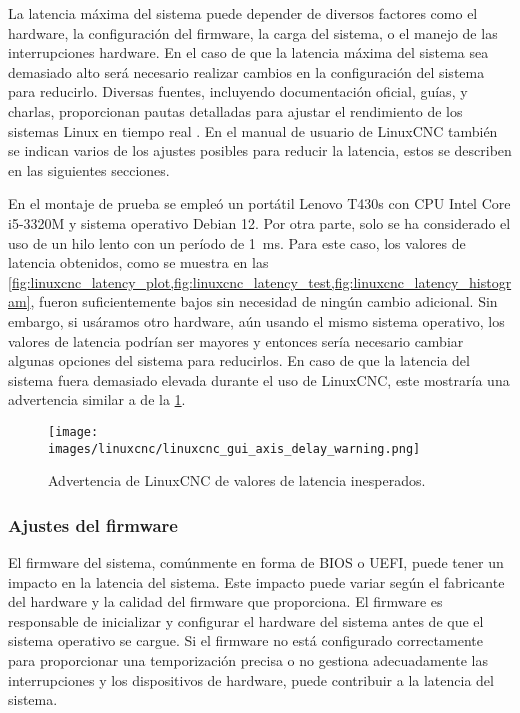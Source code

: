 \documentclass[english,spanish,a4paper,11pt]{article}
\begin{document}
La latencia máxima del sistema puede depender de diversos factores como el hardware, la configuración del firmware, la carga del sistema, o el manejo de las interrupciones hardware. En el caso de que la latencia máxima del sistema sea demasiado alto será necesario realizar cambios en la configuración del sistema para reducirlo.
Diversas fuentes, incluyendo documentación oficial, guías, y charlas, proporcionan pautas detalladas para ajustar el rendimiento de los sistemas Linux en tiempo real \cite{redhat_rt_low_latency,ubuntu_rt_tuning,lfoss2022tips,elc2023preparing}. En el manual de usuario de LinuxCNC \cite{linuxcncdoc} también se indican varios de los ajustes posibles para reducir la latencia, estos se describen en las siguientes secciones.

En el montaje de prueba se empleó un portátil Lenovo T430s con CPU Intel Core i5-3320M y sistema operativo Debian 12. Por otra parte, solo se ha considerado el uso de un hilo lento con un período de \qty{1}{\ms}. Para este caso, los valores de latencia obtenidos, como se muestra en las \cref{fig:linuxcnc_latency_plot,fig:linuxcnc_latency_test,fig:linuxcnc_latency_histogram}, fueron suficientemente bajos sin necesidad de ningún cambio adicional. Sin embargo, si usáramos otro hardware, aún usando el mismo sistema operativo, los valores de latencia podrían ser mayores y entonces sería necesario cambiar algunas opciones del sistema para reducirlos. En caso de que la latencia del sistema fuera demasiado elevada durante el uso de LinuxCNC, este mostraría una advertencia similar a de la \cref{fig:linuxcnc_gui_axis_delay_warning}.

\begin{figure}[!ht]
    \centering
    \texttt{[image: images/linuxcnc/linuxcnc\_gui\_axis\_delay\_warning.png]}
    \caption{Advertencia de LinuxCNC de valores de latencia inesperados.}
    \label{fig:linuxcnc_gui_axis_delay_warning}
\end{figure}


\subsubsection{Ajustes del firmware}

El firmware del sistema, comúnmente en forma de \ac{BIOS} o \ac{UEFI}, puede tener un impacto en la latencia del sistema. Este impacto puede variar según el fabricante del hardware y la calidad del firmware que proporciona. El firmware es responsable de inicializar y configurar el hardware del sistema antes de que el sistema operativo se cargue. Si el firmware no está configurado correctamente para proporcionar una temporización precisa o no gestiona adecuadamente las interrupciones y los dispositivos de hardware, puede contribuir a la latencia del sistema. 
\end{document}
